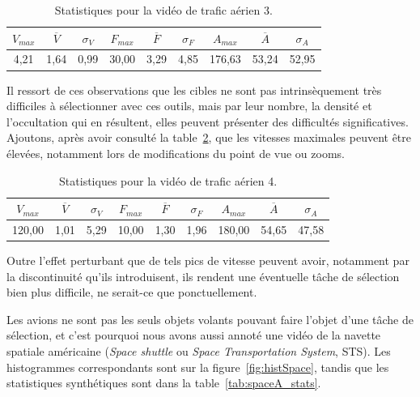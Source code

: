 \begin{table}
	\centering
	\begin{tabular}{c c c c c c c c c}
		$V_{max}$	& $\overline{V}$	& $\sigma_{V}$	& $F_{max}$	& $\overline{F}$	& $\sigma_{F}$	& $A_{max}$	& $\overline{A}$	& $\sigma_{A}$	\bigstrut[b] \\ \hline

		4,21		& 1,64				& 0,99			& 30,00		& 3,29				& 4,85			& 176,63	& 53,24				& 52,95			\bigstrut[t] \\
	\end{tabular}
	\caption[Statistiques pour la vidéo  de trafic aérien 3]{Statistiques pour la vidéo  de trafic aérien 3.}
	\label{tab:hkg_stats}
\end{table}

	Il ressort de ces observations que les cibles ne sont pas intrinsèquement très difficiles à sélectionner avec ces outils, mais par leur nombre, la densité et l'occultation qui en résultent, elles peuvent présenter des difficultés significatives. Ajoutons, après avoir consulté la table~\ref{tab:flightradar2a_stats}, que les vitesses maximales peuvent être élevées, notamment lors de modifications du point de vue ou zooms.

\begin{table}
	\centering
	\begin{tabular}{c c c c c c c c c}
		$V_{max}$	& $\overline{V}$	& $\sigma_{V}$	& $F_{max}$	& $\overline{F}$	& $\sigma_{F}$	& $A_{max}$	& $\overline{A}$	& $\sigma_{A}$	\bigstrut[b] \\ \hline

		120,00		& 1,01				& 5,29			& 10,00		& 1,30				& 1,96			& 180,00	& 54,65				& 47,58			\bigstrut[t] \\
	\end{tabular}
	\caption[Statistiques pour la vidéo  de trafic aérien 4]{Statistiques pour la vidéo de trafic aérien 4.}
	\label{tab:flightradar2a_stats}
\end{table}

	Outre l'effet perturbant que de tels pics de vitesse peuvent avoir, notamment par la discontinuité qu'ils introduisent, ils rendent une éventuelle tâche de sélection bien plus difficile, ne serait-ce que ponctuellement.
	
	Les avions ne sont pas les seuls objets volants pouvant faire l'objet d'une tâche de sélection, et c'est pourquoi nous avons aussi annoté une vidéo de la navette spatiale américaine (\emph{Space shuttle} ou \emph{Space Transportation System}, STS). Les histogrammes correspondants sont sur la figure~\ref{fig:histSpace}, tandis que les statistiques synthétiques sont dans la table~\ref{tab:spaceA_stats}.
	
